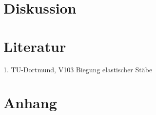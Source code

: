 \section{Diskussion}
\label{sec:diskussion}



\section{Literatur}
\label{sec:Literatur}
1. TU-Dortmund, V103 Biegung elastischer Stäbe

\section{Anhang}
\label{sec:anhang}